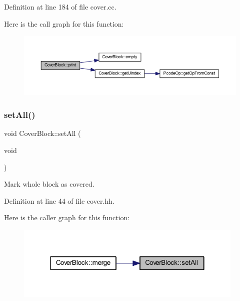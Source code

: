 Definition at line 184 of file cover.\+cc.

Here is the call graph for this function\+:
\nopagebreak
\begin{figure}[H]
\begin{center}
\leavevmode
\includegraphics[width=350pt]{class_cover_block_a58f570ab514cdabc3b9671cdb08911e7_cgraph}
\end{center}
\end{figure}
\mbox{\label{class_cover_block_acf6e1171ca6513855789a057f9c4f92c}} 
\subsubsection{\texorpdfstring{setAll()}{setAll()}}
{\footnotesize\ttfamily void Cover\+Block\+::set\+All (\begin{DoxyParamCaption}\item[{void}]{ }\end{DoxyParamCaption})\hspace{0.3cm}{\ttfamily [inline]}}



Mark whole block as covered. 



Definition at line 44 of file cover.\+hh.

Here is the caller graph for this function\+:
\nopagebreak
\begin{figure}[H]
\begin{center}
\leavevmode
\includegraphics[width=310pt]{class_cover_block_acf6e1171ca6513855789a057f9c4f92c_icgraph}
\end{center}
\end{figure}
\mbox{\label{class_cover_block_a9c1ef0ab93cc4107a954cd4842ca1d27}} 
